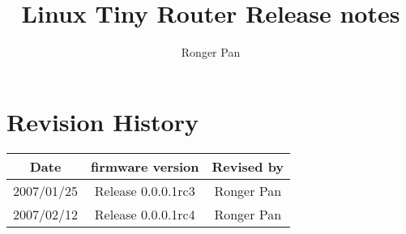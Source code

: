 \documentclass[12pt]{report}
\newcommand{\tlabel}[1]{
  \label{#1}%
  }
\newcommand{\ispnpedf}{\mbox{ISP-NPEDF}}
\begin{document}
\title{Linux Tiny Router Release notes}


\author{\normalsize{Ronger Pan}}

\maketitle
\thispagestyle{empty}





\psfull
\tableofcontents
\thispagestyle{empty}
\newpage
\setcounter{page}{1}

\chapter{Revision History}
\tlabel{sec:revision-history}

   \begin{tabular}{|c||c|c|} \hline
      Date & firmware version  & Revised by \\ \hline
      2007/01/25 & Release 0.0.0.1rc3 & Ronger Pan \\ \hline
	  2007/02/12 & Release 0.0.0.1rc4 & Ronger Pan \\ \hline
   \end{tabular}
\end{document}
